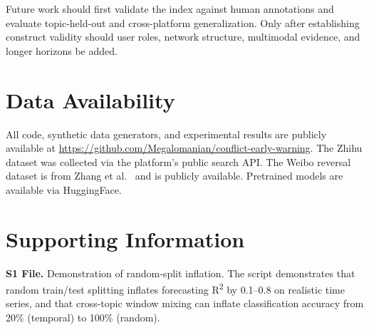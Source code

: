 \documentclass[11pt,a4paper]{article}
\begin{document}
Future work should first validate the index against human annotations and evaluate topic-held-out and cross-platform generalization. Only after establishing construct validity should user roles, network structure, multimodal evidence, and longer horizons be added.

\section*{Data Availability}

All code, synthetic data generators, and experimental results are publicly available at \url{https://github.com/Megalomanian/conflict-early-warning}. The Zhihu dataset was collected via the platform's public search API. The Weibo reversal dataset is from Zhang et al.~\cite{Zhang2023Reversal} and is publicly available. Pretrained models are available via HuggingFace.

\section*{Supporting Information}

\textbf{S1 File.} Demonstration of random-split inflation. The script  demonstrates that random train/test splitting inflates forecasting R\textsuperscript{2} by 0.1--0.8 on realistic time series, and that cross-topic window mixing can inflate classification accuracy from 20\% (temporal) to 100\% (random).



\end{document}
